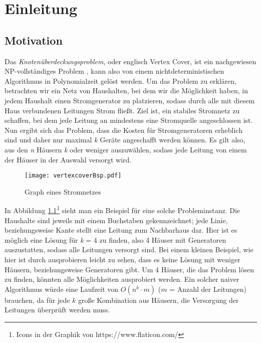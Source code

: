 
\chapter{Einleitung}
\label{ch:Einleitung}

\section{Motivation}
\label{ch:Einleitung:sec:Motivation}
Das \emph{Knotenüberdeckungsproblem}, oder englisch Vertex Cover, ist ein nachgewiesen NP-vollständiges Problem \cite{intract}, kann also von einem nichtdeterministischen Algorithmus in Polynomialzeit gelöst werden. Um das Problem zu erklären, betrachten wir ein Netz von Haushalten, bei dem wir die Möglichkeit haben, in jedem Haushalt einen Stromgenerator zu platzieren, sodass durch alle mit diesem Haus verbundenen Leitungen Strom fließt. Ziel ist, ein stabiles Stromnetz zu schaffen, bei dem jede Leitung an mindestens eine Stromquelle angeschlossen ist. Nun ergibt sich das Problem, dass die Kosten für Stromgeneratoren erheblich sind und daher nur maximal \emph{k} Geräte angeschafft werden können. Es gilt also, aus den \emph{n} Häusern \emph{k} oder weniger auszuwählen, sodass jede Leitung von einem der Häuser in der Auswahl versorgt wird.
\begin{figure}[htb]
\centering
  	{\texttt{[image: vertexcoverBsp.pdf]}}
	\caption{Graph eines Stromnetzes \label{fig:vc}}
\centering
\end{figure}
In Abbildung \ref{fig:vc}\footnote{Icons in der Graphik von https://www.flaticon.com/}   sieht man ein Beispiel für eine solche Probleminstanz. Die Haushalte sind jeweils mit einem Buchstaben gekennzeichnet; jede Linie, beziehungsweise Kante stellt eine Leitung zum Nachbarhaus dar. Hier ist es möglich eine Lösung für \emph{k} = 4 zu finden, also 4 Häuser mit Generatoren auszustatten, sodass alle Leitungen versorgt sind. Bei einem kleinen Beispiel, wie hier ist durch ausprobieren leicht zu sehen, dass es keine Lösung mit weniger Häusern, beziehungsweise Generatoren gibt. Um 4 Häuser, die das Problem lösen zu finden, könnten alle Möglichkeiten ausprobiert werden. Ein solcher naiver Algorithmus würde eine Laufzeit von $O(n^{k} \cdot m)$ ($m$ = Anzahl der Leitungen) brauchen, da für jede $k$ große Kombination aus Häusern, die Versorgung der Leitungen überprüft werden muss.\\
